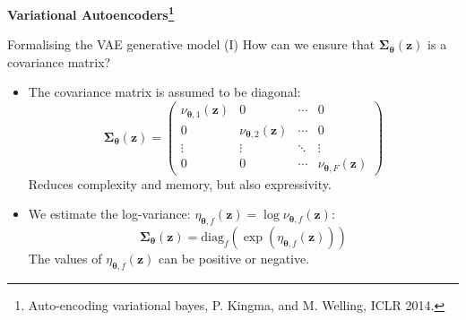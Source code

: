 \documentclass[11pt,aspectratio=169,usenames,dvipsnames]{beamer}
\newcommand{\bs}{\boldsymbol}
\begin{document}
{
\begin{frame}%
  \centering \color{white}\large\bf
  Variational Autoencoders\footnote{\color{white}Auto-encoding variational bayes, P. Kingma, and M. Welling, ICLR 2014.}
\end{frame}
}

\begin{frame}{Formalising the VAE generative model (I)}
  How can we ensure that $\bs{\Sigma}_{\bs{\theta}}(\bs{z})$ is a covariance matrix?
  \begin{itemize}
   \item The covariance matrix is assumed to be diagonal:
   \begin{equation*}\bs{\Sigma}_{\bs{\theta}}(\bs{z}) = \left(\begin{array}{cccc}
   \nu_{\bs{\theta},1}(\bs{z}) & 0 & \cdots & 0 \\
   0 & \nu_{\bs{\theta},2}(\bs{z}) & \cdots & 0 \\
   \vdots & \vdots & \ddots & \vdots \\
   0 & 0 & \cdots & \nu_{\bs{\theta},F}(\bs{z})
   \end{array}\right)\end{equation*}
   Reduces complexity and memory, but also expressivity.
   \item We estimate the log-variance: $\eta_{\bs{\theta},f}(\bs{z}) = \log \nu_{\bs{\theta},f}(\bs{z})$:
   \begin{equation*}\bs{\Sigma}_{\bs{\theta}}(\bs{z}) = \textrm{diag}_f \left(\exp \left(\eta_{\bs{\theta},f}(\bs{z})\right)\right)\end{equation*}
   The values of $\eta_{\bs{\theta},f}(\bs{z})$ can be positive or negative.
  \end{itemize}


\end{frame}
\end{document}
